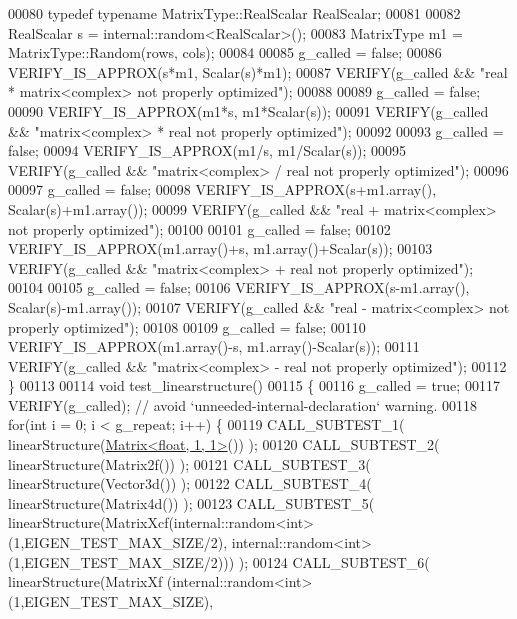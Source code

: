 \begin{DoxyCode}
00080   \textcolor{keyword}{typedef} \textcolor{keyword}{typename} MatrixType::RealScalar RealScalar;
00081   
00082   RealScalar s = internal::random<RealScalar>();
00083   MatrixType m1 = MatrixType::Random(rows, cols);
00084   
00085   g\_called = \textcolor{keyword}{false};
00086   VERIFY\_IS\_APPROX(s*m1, Scalar(s)*m1);
00087   VERIFY(g\_called && \textcolor{stringliteral}{"real * matrix<complex> not properly optimized"});
00088   
00089   g\_called = \textcolor{keyword}{false};
00090   VERIFY\_IS\_APPROX(m1*s, m1*Scalar(s));
00091   VERIFY(g\_called && \textcolor{stringliteral}{"matrix<complex> * real not properly optimized"});
00092   
00093   g\_called = \textcolor{keyword}{false};
00094   VERIFY\_IS\_APPROX(m1/s, m1/Scalar(s));
00095   VERIFY(g\_called && \textcolor{stringliteral}{"matrix<complex> / real not properly optimized"});
00096 
00097   g\_called = \textcolor{keyword}{false};
00098   VERIFY\_IS\_APPROX(s+m1.array(), Scalar(s)+m1.array());
00099   VERIFY(g\_called && \textcolor{stringliteral}{"real + matrix<complex> not properly optimized"});
00100 
00101   g\_called = \textcolor{keyword}{false};
00102   VERIFY\_IS\_APPROX(m1.array()+s, m1.array()+Scalar(s));
00103   VERIFY(g\_called && \textcolor{stringliteral}{"matrix<complex> + real not properly optimized"});
00104 
00105   g\_called = \textcolor{keyword}{false};
00106   VERIFY\_IS\_APPROX(s-m1.array(), Scalar(s)-m1.array());
00107   VERIFY(g\_called && \textcolor{stringliteral}{"real - matrix<complex> not properly optimized"});
00108 
00109   g\_called = \textcolor{keyword}{false};
00110   VERIFY\_IS\_APPROX(m1.array()-s, m1.array()-Scalar(s));
00111   VERIFY(g\_called && \textcolor{stringliteral}{"matrix<complex> - real not properly optimized"});
00112 \}
00113 
00114 \textcolor{keywordtype}{void} test\_linearstructure()
00115 \{
00116   g\_called = \textcolor{keyword}{true};
00117   VERIFY(g\_called); \textcolor{comment}{// avoid `unneeded-internal-declaration` warning.}
00118   \textcolor{keywordflow}{for}(\textcolor{keywordtype}{int} i = 0; i < g\_repeat; i++) \{
00119     CALL\_SUBTEST\_1( linearStructure(\hyperlink{group___core___module_class_eigen_1_1_matrix}{Matrix<float, 1, 1>}()) );
00120     CALL\_SUBTEST\_2( linearStructure(Matrix2f()) );
00121     CALL\_SUBTEST\_3( linearStructure(Vector3d()) );
00122     CALL\_SUBTEST\_4( linearStructure(Matrix4d()) );
00123     CALL\_SUBTEST\_5( linearStructure(MatrixXcf(internal::random<int>(1,EIGEN\_TEST\_MAX\_SIZE/2), 
      internal::random<int>(1,EIGEN\_TEST\_MAX\_SIZE/2))) );
00124     CALL\_SUBTEST\_6( linearStructure(MatrixXf (internal::random<int>(1,EIGEN\_TEST\_MAX\_SIZE), 

\end{DoxyCode}
